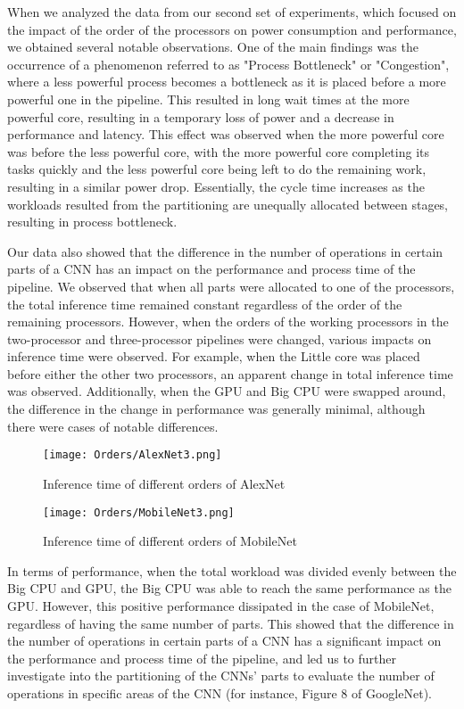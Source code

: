 \documentclass[a4paper, 12pt, fleqn]{article}
\begin{document}
When we analyzed the data from our second set of experiments, which focused on the impact of the order of the processors on power consumption and performance, we obtained several notable observations. One of the main findings was the occurrence of a phenomenon referred to as "Process Bottleneck" or "Congestion", where a less powerful process becomes a bottleneck as it is placed before a more powerful one in the pipeline. This resulted in long wait times at the more powerful core, resulting in a temporary loss of power and a decrease in performance and latency. This effect was observed when the more powerful core was before the less powerful core, with the more powerful core completing its tasks quickly and the less powerful core being left to do the remaining work, resulting in a similar power drop. Essentially, the cycle time increases as the workloads resulted from the partitioning are unequally allocated between stages, resulting in process bottleneck.

Our data also showed that the difference in the number of operations in certain parts of a CNN has an impact on the performance and process time of the pipeline. We observed that when all parts were allocated to one of the processors, the total inference time remained constant regardless of the order of the remaining processors. However, when the orders of the working processors in the two-processor and three-processor pipelines were changed, various impacts on inference time were observed. For example, when the Little core was placed before either the other two processors, an apparent change in total inference time was observed. Additionally, when the GPU and Big CPU were swapped around, the difference in the change in performance was generally minimal, although there were cases of notable differences.

\begin{figure}[ht]
    \centering
    \texttt{[image: Orders/AlexNet3.png]}
    \caption{Inference time of different orders of AlexNet}
    \label{fig:f6}
\end{figure}


\begin{figure}[ht]
    \centering
    \texttt{[image: Orders/MobileNet3.png]}
    \caption{Inference time of different orders of MobileNet}
    \label{fig:f7}
\end{figure}

In terms of performance, when the total workload was divided evenly between the Big CPU and GPU, the Big CPU was able to reach the same performance as the GPU. However, this positive performance dissipated in the case of MobileNet, regardless of having the same number of parts. This showed that the difference in the number of operations in certain parts of a CNN has a significant impact on the performance and process time of the pipeline, and led us to further investigate into the partitioning of the CNNs’ parts to evaluate the number of operations in specific areas of the CNN (for instance, Figure 8 of GoogleNet).
\end{document}
